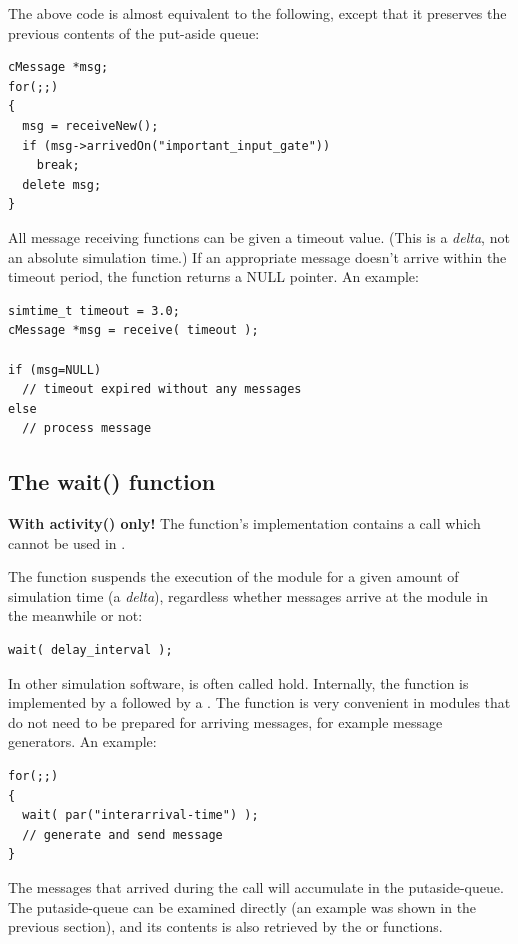 The above code is almost equivalent to the following, except
that it preserves the previous contents of the put-aside queue:

\begin{verbatim}
cMessage *msg;
for(;;)
{
  msg = receiveNew();
  if (msg->arrivedOn("important_input_gate"))
    break;
  delete msg;
}
\end{verbatim}


All message receiving functions can be given a timeout
value. (This is a \textit{delta}, not an
absolute simulation time.) If an appropriate message doesn't arrive
within the timeout period, the function returns a NULL pointer. An
example:

\begin{verbatim}
simtime_t timeout = 3.0;
cMessage *msg = receive( timeout );

if (msg=NULL)
  // timeout expired without any messages
else
  // process message
\end{verbatim}



\subsection{The wait() function}

\textbf{With activity() only!} The  function's implementation
contains a  call which cannot be used in .

The  function suspends the execution of the module for
a given amount of simulation time (a \textit{delta}), regardless whether
messages arrive at the module in the meanwhile or not:

\begin{verbatim}
wait( delay_interval );
\end{verbatim}

In other simulation software,  is often called hold.
Internally, the  function is implemented by a
 followed by a . The
 function is very convenient in modules that do not need
to be prepared for arriving messages, for example message generators.
An example:

\begin{verbatim}
for(;;)
{
  wait( par("interarrival-time") );
  // generate and send message
}
\end{verbatim}

The messages that arrived during the  call will
accumulate in the putaside-queue. The putaside-queue can be examined
directly (an example was shown in the previous section), and its
contents is also retrieved by the  or
 functions.





